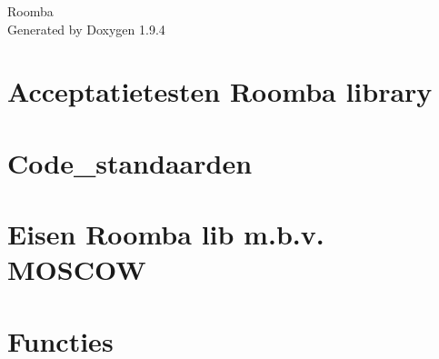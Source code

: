 \documentclass[twoside]{book}
\newcommand{\+}{\discretionary{\mbox{\scriptsize$\hookleftarrow$}}{}{}}
\newcommand{\clearemptydoublepage}{%
    \newpage{\pagestyle{empty}\cleardoublepage}%
  }
\begin{document}
  \raggedbottom
    \hypersetup{pageanchor=false,
                bookmarksnumbered=true,
                pdfencoding=unicode
               }
  \begin{titlepage}
  \vspace*{7cm}
  \begin{center}%
  {\Large Roomba}\\
  \vspace*{1cm}
  {\large Generated by Doxygen 1.9.4}\\
  \end{center}
  \end{titlepage}
  \clearemptydoublepage
  \tableofcontents
  \clearemptydoublepage
  \hypersetup{pageanchor=true}
\chapter{Acceptatietesten Roomba library}
\label{md__c___users_crtak__roomba_project_cpp__documentatie__m_d__acceptatietesten__r_o_o_m_b_a__lib}

\chapter{Code\+\_\+standaarden}
\label{md__c___users_crtak__roomba_project_cpp__documentatie__m_d__code_standaarden}

\chapter{Eisen Roomba lib m.\+b.\+v. MOSCOW}
\label{md__c___users_crtak__roomba_project_cpp__documentatie__m_d__eisen__r_o_o_m_b_a_lib}

\chapter{Functies}
\label{md__c___users_crtak__roomba_project_cpp__documentatie__m_d__functies__r_o_o_m_b_a_lib}

\end{document}
